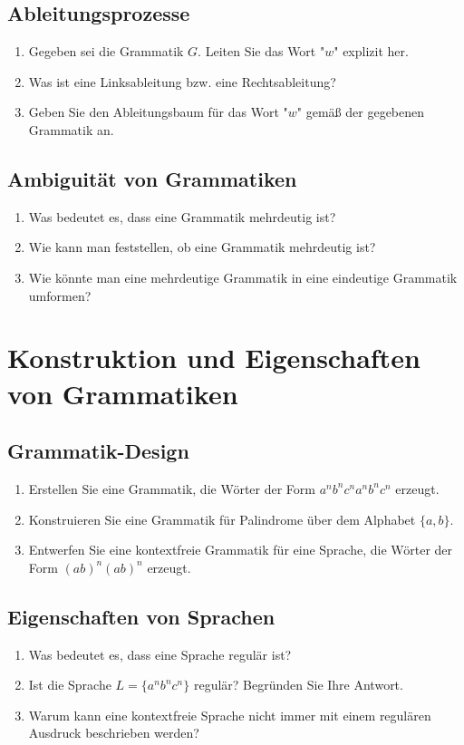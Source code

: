 \documentclass[a4paper,12pt]{article}
\begin{document}
	\subsection*{Ableitungsprozesse}
	\begin{enumerate}
		\item Gegeben sei die Grammatik $G$. Leiten Sie das Wort "$w$" explizit her.
		\item Was ist eine Linksableitung bzw. eine Rechtsableitung?
		\item Geben Sie den Ableitungsbaum für das Wort "$w$" gemäß der gegebenen Grammatik an.
	\end{enumerate}
	
	\subsection*{Ambiguität von Grammatiken}
	\begin{enumerate}
		\item Was bedeutet es, dass eine Grammatik \glqq mehrdeutig\grqq{} ist?
		\item Wie kann man feststellen, ob eine Grammatik mehrdeutig ist?
		\item Wie könnte man eine mehrdeutige Grammatik in eine eindeutige Grammatik umformen?
	\end{enumerate}
	
	\section*{Konstruktion und Eigenschaften von Grammatiken}
	
	\subsection*{Grammatik-Design}
	\begin{enumerate}
		\item Erstellen Sie eine Grammatik, die Wörter der Form $a^n b^n c^n a^n b^n c^n$ erzeugt.
		\item Konstruieren Sie eine Grammatik für Palindrome über dem Alphabet $\{a,b\}$.
		\item Entwerfen Sie eine kontextfreie Grammatik für eine Sprache, die Wörter der Form $(ab)^n (ab)^n$ erzeugt.
	\end{enumerate}
	
	\subsection*{Eigenschaften von Sprachen}
	\begin{enumerate}
		\item Was bedeutet es, dass eine Sprache regulär ist?
		\item Ist die Sprache $L=\{a^n b^n c^n\}$ regulär? Begründen Sie Ihre Antwort.
		\item Warum kann eine kontextfreie Sprache nicht immer mit einem regulären Ausdruck beschrieben werden?
	\end{enumerate}
	
\end{document}
